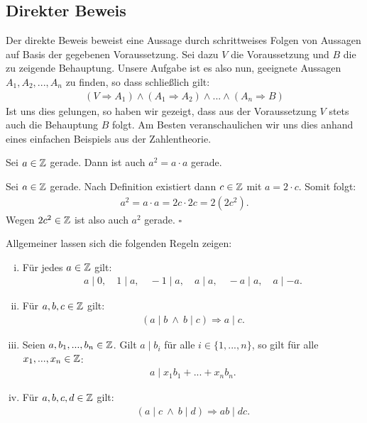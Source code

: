 \subsection{Direkter Beweis}
Der direkte Beweis beweist eine Aussage durch schrittweises Folgen von Aussagen auf Basis der gegebenen Voraussetzung. 
Sei dazu $V$ die Voraussetzung und $B$ die zu zeigende Behauptung. Unsere Aufgabe ist es also nun, geeignete Aussagen $A_1, A_2,...,A_n$ zu finden, 
so dass schließlich gilt: 
\begin{align*}
    (V \Rightarrow A_1) \wedge (A_1 \Rightarrow A_2) \wedge ... \wedge (A_n \Rightarrow B)
\end{align*}
Ist uns dies gelungen, so haben wir gezeigt, dass aus der Voraussetzung $V$ stets auch die Behauptung $B$ folgt. 
Am Besten veranschaulichen wir uns dies anhand eines einfachen Beispiels aus der Zahlentheorie. 
\begin{proposition}
    Sei $a \in \mathbb{Z}$ gerade. Dann ist auch $a^2 = a \cdot a$ gerade. 
\end{proposition}


\begin{proof*}
    Sei $a \in \mathbb{Z}$ gerade. Nach Definition existiert dann $c \in \mathbb{Z}$ mit $a = 2 \cdot c$. Somit folgt: 
    \begin{align*}
        a^2 = a \cdot a = 2c \cdot 2c = 2(2c^2).
    \end{align*}
    Wegen $2c^2 \in \mathbb{Z}$ ist also auch $a^2$ gerade. 
    \hfill $\square$
\end{proof*}

Allgemeiner lassen sich die folgenden Regeln zeigen:

\begin{theorem}
    \begin{enumerate}[(i)]
        \item 
        Für jedes $a \in \mathbb{Z}$ gilt: 
        \begin{align*}
            a \mid 0, \quad 1 \mid a, \quad -1 \mid a,  \quad a \mid a, \quad -a \mid a, \quad a \mid -a . 
        \end{align*}
        \item 
        Für $a,b,c \in \mathbb{Z}$ gilt: 
        \begin{align*}
            (a \mid b \ \wedge \ b \mid c) \Rightarrow a \mid c . 
        \end{align*}
        \item 
        Seien $a,b_1,...,b_n \in \mathbb{Z}$. Gilt $a \mid b_i$ für alle $i \in \{1,...,n\}$, so gilt für alle $x_1,...,x_n \in \mathbb{Z}$: 
        \begin{align*}
            a \mid x_1 b_1 + ... + x_n b_n .
        \end{align*}
        \item 
        Für $a,b,c,d \in \mathbb{Z}$ gilt: 
        \begin{align*}
            (a \mid c \ \wedge  \ b \mid d) \Rightarrow ab \mid dc . 
        \end{align*}
    \end{enumerate}
\end{theorem}

